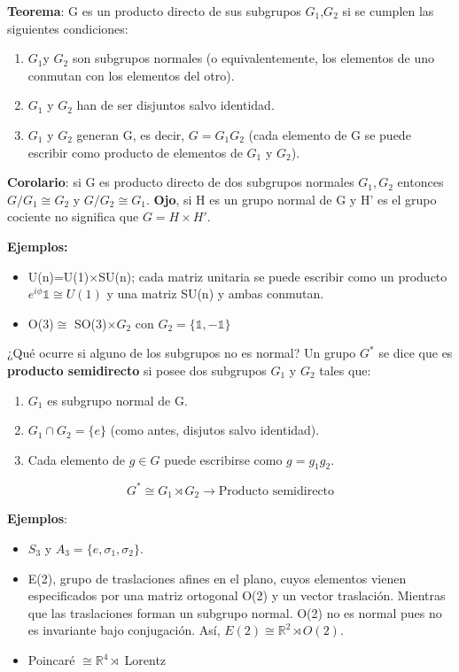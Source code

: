 \textbf{Teorema}: G es un producto directo de sus subgrupos $G_1$,$G_2$ si se cumplen las siguientes condiciones:

\begin{enumerate}
\item $G_1$y $G_2$ son subgrupos normales (o equivalentemente, los elementos de uno conmutan con los elementos del otro).
\item $G_1$ y $G_2$ han de ser disjuntos salvo identidad.
\item $G_1$ y $G_2$ generan G, es decir, $G=G_1G_2$ (cada elemento de G se puede escribir como producto de elementos de $G_1$ y $G_2$).
\end{enumerate}

\textbf{Corolario}: si G es producto directo de dos subgrupos normales $G_1,G_2$ entonces $G/G_1 \cong G_2$ y $G/G_2 \cong G_1$. \textbf{Ojo}, si H es un grupo normal de G y H' es el grupo cociente no significa que $G=H\times H'$.

\bigskip
\textbf{Ejemplos:}

\begin{itemize}
\item U(n)=U(1)$\times$SU(n); cada matriz unitaria se puede escribir como un producto $e^{i\phi}\mathds{1}\cong U(1)$ y una matriz SU(n) y ambas conmutan.
\item O(3)$\cong$ SO(3)$\times G_2$ con $G_2 =\lbrace \mathds{1},-\mathds{1}\rbrace$
\end{itemize}

¿Qué ocurre si alguno de los subgrupos no es normal? Un grupo $G^*$ se dice que es \textbf{producto semidirecto} si posee dos subgrupos $G_1$ y $G_2$ tales que:

\begin{enumerate}
\item $G_1$ es subgrupo normal de G.
\item $G_1 \cap G_2 =\lbrace e\rbrace$ (como antes, disjutos salvo identidad).
\item Cada elemento de $g\in G$ puede escribirse como $g=g_1g_2$.
\end{enumerate}

$$G^*\cong G_1\rtimes G_2 \to \text{Producto semidirecto}$$

\newpage
\textbf{Ejemplos}:

\begin{itemize}
\item $S_3$ y $A_3=\lbrace e,\sigma _1, \sigma _2 \rbrace$.

\item E(2), grupo de traslaciones afines en el plano, cuyos elementos vienen especificados por una matriz ortogonal O(2) y un vector traslación. Mientras que las traslaciones forman un subgrupo normal. O(2) no es normal pues no es invariante bajo conjugación. Así, $E(2)\cong \mathds{R}^2\rtimes O(2)$.
\item Poincaré $\cong \mathds{R}^4 \rtimes$ Lorentz
\end{itemize}




